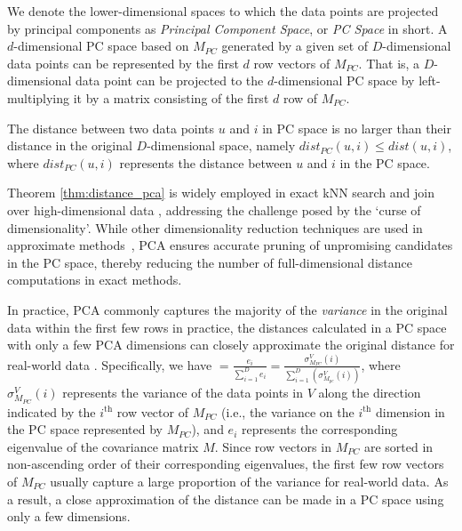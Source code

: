 We denote the lower-dimensional spaces to which the data points are projected by principal components as \emph{Principal Component Space}, or \emph{PC Space} in short.
%
A $d$-dimensional PC space based on $M_{PC}$ generated by a given set of $D$-dimensional data points can be represented by the first $d$ row vectors of $M_{PC}$. That is, a $D$-dimensional data point can be projected to the $d$-dimensional PC space by left-multiplying it by a matrix consisting of the first $d$ row of $M_{PC}$.

\begin{theorem} [PC Distance]
\label{thm:distance_pca}
  The distance between two data points $u$ and $i$ in PC space is no larger than their distance in the original $D$-dimensional space, namely $dist_{PC}(u,i)\leq dist(u,i)$, where $dist_{PC}(u,i)$ represents the distance between $u$ and $i$ in the PC space.
\end{theorem}

Theorem \ref{thm:distance_pca} is widely employed in exact kNN search and join over high-dimensional data \cite{xia2004gorder, yu2007efficient, yang2014continuous, ukey2022efficient, ukey2023efficient, ukey2023knn}, addressing the challenge posed by the `curse of dimensionality'.
%
While other dimensionality reduction techniques are used in approximate methods~\cite{chakrabarti2002locally, cui2005exploring, zhang2012efficient, sun2014srs, yang2014continuous, gu2018approximate}, PCA ensures accurate pruning of unpromising candidates in the PC space, thereby reducing the number of full-dimensional distance computations in exact methods.


\begin{remark}
In practice, PCA commonly captures the majority of the \emph{variance} in the original data within the first few rows in practice, the distances calculated in a PC space with only a few PCA dimensions can closely approximate the original distance for real-world data \cite{gewers2021principal, hasan2021review}.
%
Specifically, we have $=\frac{e_{i}}{\sum_{i=1}^{D}e_{i}}=\frac{\sigma_{M_{PC}}^{V}(i)}{\sum_{i=1}^{D}(\sigma_{M_{pc}}^{V}(i))}$, where $\sigma_{M_{PC}}^{V}(i)$ represents the variance of the data points in $V$ along the direction indicated by the $i^\text{th}$ row vector of $M_{PC}$ (i.e., the variance on the $i^\text{th}$ dimension in the PC space represented by $M_{PC}$), and $e_{i}$ represents the corresponding eigenvalue of the covariance matrix $M$.
%
Since row vectors in $M_{PC}$ are sorted in non-ascending order of their corresponding eigenvalues, the first few row vectors of $M_{PC}$ usually capture a large proportion of the variance for real-world data. As a result, a close approximation of the distance can be made in a PC space using only a few dimensions.
\end{remark}